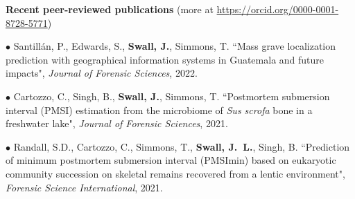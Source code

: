 \documentclass[11pt]{article}
\def\newsectn{\vspace*{0.6cm}}
\def\newitem{\vspace*{0.2cm}}
\begin{document}









\newsectn
{\Large \textbf{Recent peer-reviewed publications}} (more at
\url{https://orcid.org/0000-0001-8728-5771})


$\bullet$ Santillán, P., Edwards, S., \textbf{Swall, J.}, Simmons, T. ``Mass
grave localization prediction with geographical information systems in
Guatemala and future impacts", \textit{Journal of Forensic Sciences}, 2022.

$\bullet$ Cartozzo, C., Singh, B., \textbf{Swall, J.},  Simmons, T.
``Postmortem submersion interval (PMSI) estimation from the microbiome of
\textit{Sus scrofa} bone in a freshwater lake", \textit{Journal of
Forensic Sciences}, 2021.

$\bullet$ Randall, S.D., Cartozzo, C., Simmons, T., \textbf{Swall, J.~L.},
Singh, B. ``Prediction of minimum postmortem submersion interval (PMSImin)
based on eukaryotic community succession on skeletal remains recovered from
a lentic environment", \textit{Forensic Science International}, 2021.
\end{document}
